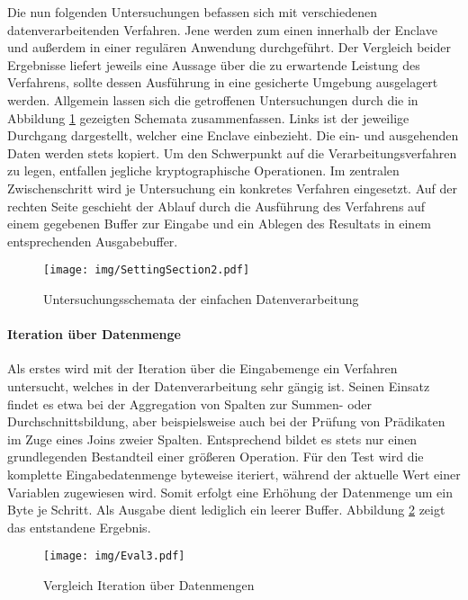 Die nun folgenden Untersuchungen befassen sich mit verschiedenen datenverarbeitenden Verfahren. Jene werden zum einen innerhalb der Enclave und außerdem in einer regulären Anwendung durchgeführt. Der Vergleich beider Ergebnisse liefert jeweils eine Aussage über die zu erwartende Leistung des Verfahrens, sollte dessen Ausführung in eine gesicherte Umgebung ausgelagert werden. Allgemein lassen sich die getroffenen Untersuchungen durch die in Abbildung \ref{fig:settingsection2} gezeigten Schemata zusammenfassen. Links ist der jeweilige Durchgang dargestellt, welcher eine Enclave einbezieht. Die ein- und ausgehenden Daten werden stets kopiert. Um den Schwerpunkt auf die Verarbeitungsverfahren zu legen, entfallen jegliche kryptographische Operationen. Im zentralen Zwischenschritt wird je Untersuchung ein konkretes Verfahren eingesetzt. Auf der rechten Seite geschieht der Ablauf durch die Ausführung des Verfahrens auf einem gegebenen Buffer zur Eingabe und ein Ablegen des Resultats in einem entsprechenden Ausgabebuffer.

\begin{figure}[h]
	\texttt{[image: img/SettingSection2.pdf]}
	\centering
	\caption{Untersuchungsschemata der einfachen Datenverarbeitung}
	\label{fig:settingsection2}
\end{figure}

\paragraph{Iteration über Datenmenge}

Als erstes wird mit der Iteration über die Eingabemenge ein Verfahren untersucht, welches in der Datenverarbeitung sehr gängig ist. Seinen Einsatz findet es etwa bei der Aggregation von Spalten zur Summen- oder Durchschnittsbildung, aber beispielsweise auch bei der Prüfung von Prädikaten im Zuge eines Joins zweier Spalten. Entsprechend bildet es stets nur einen grundlegenden Bestandteil einer größeren Operation. Für den Test wird die komplette Eingabedatenmenge byteweise iteriert, während der aktuelle Wert einer Variablen zugewiesen wird. Somit erfolgt eine Erhöhung der Datenmenge um ein Byte je Schritt. Als Ausgabe dient lediglich ein leerer Buffer. Abbildung \ref{fig:eval3} zeigt das entstandene Ergebnis.

\begin{figure}[h]
	\texttt{[image: img/Eval3.pdf]}
	\centering
	\caption{Vergleich Iteration über Datenmengen}
	\label{fig:eval3}
\end{figure}

